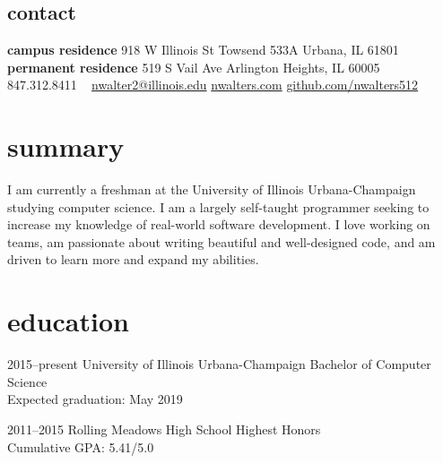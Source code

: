 \documentclass[]{resume}
\begin{document}


\begin{aside} %
\section{contact}\vspace{0.25cm}
\textbf{campus residence}
918 W Illinois St
Towsend 533A
Urbana, IL
61801
~
\textbf{permanent residence}
519 S Vail Ave
Arlington Heights, IL
60005
~
847.312.8411
~
\href{mailto:nwalter2@illinois.edu}{nwalter2@illinois.edu}
\href{http://www.nwalters.com}{nwalters.com}
\href{http://github.com/nwalters512}{github.com/nwalters512}
\end{aside}



\vspace{0.1cm} %
\section{summary}

I am currently a freshman at the University of Illinois Urbana-Champaign studying computer science. I am a largely self-taught programmer seeking to increase my knowledge of real-world software development. I love working on teams, am passionate about writing beautiful and well-designed code, and am driven to learn more and expand my abilities.


\section{education}

\begin{entrylist}


\entry
{2015--present}
{University of Illinois Urbana-Champaign}
{}
{Bachelor of Computer Science \\
Expected graduation: May 2019}


\entry
{2011--2015}
{Rolling Meadows High School}
{}
{Highest Honors \\
Cumulative GPA: 5.41/5.0}


\end{entrylist}
\end{document}
